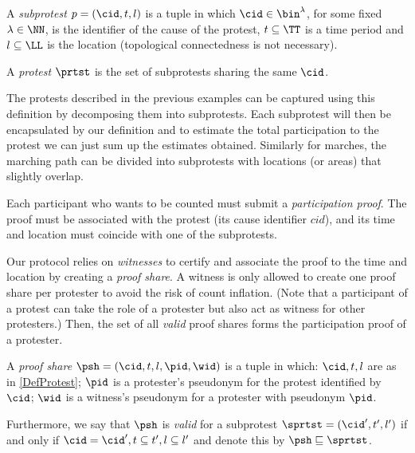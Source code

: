\begin{definition}\label{DefProtest}
  A \emph{subprotest} \(p = (\cid, t, l)\) is a tuple in which \(\cid\in 
    \bin^{\lambda}\), for some fixed \(\lambda\in \NN\), is the identifier of 
  the cause of the protest, \(t \subseteq \TT\) is a time period and \(l 
    \subseteq \LL\) is the location (topological connectedness is not 
  necessary).

  A \emph{protest} \(\prtst\) is the set of subprotests sharing the same \(\cid\).
\end{definition}

The protests described in the previous examples can be captured using this definition by decomposing them into subprotests.
Each subprotest will then be encapsulated by our definition and to estimate the total participation to the protest we can just sum up the estimates obtained.
Similarly for marches, the marching path can be divided into subprotests with locations (or areas) that slightly overlap.

Each participant who wants to be counted must submit a \emph{participation proof}.
The proof must be associated with the protest (\ie its cause identifier \(cid\)), and its time and location must coincide with one of the subprotests.

Our protocol relies on \emph{witnesses} to certify and associate the proof to the time and location by creating a \emph{proof share}.
A witness is only allowed to create one proof share per protester to avoid the risk of count inflation.
(Note that a participant of a protest can take the role of a protester but also 
act as witness for other protesters.)
Then, the set of all \emph{valid} proof shares forms the participation proof of a protester.


\begin{definition}%
  \label{DefProofShare}\label{DefProofShares}
  A \emph{proof share} \(\psh = (\cid, t, l, \pid, \wid)\) is a tuple in which: 
  \(\cid, t, l\) are as in \cref{DefProtest};
  \(\pid\) is a protester's pseudonym for the protest identified by \(\cid\);
  \(\wid\) is a witness's pseudonym for a protester with pseudonym \(\pid\).

  Furthermore, we say that \(\psh\) is \emph{valid} for a subprotest \(\sprtst = (\cid', t', l')\) if and only if \(\cid = \cid', t\subseteq t', l\subseteq l'\) and denote this by 
  \(\psh \sqsubseteq \sprtst\).
  
\end{definition}


